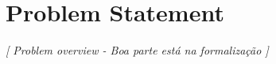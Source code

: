 \chapter{Problem Statement}
\label{chap:Chapter4}

\textit{
	[
		Problem overview - Boa parte está na formalização
	]
}

